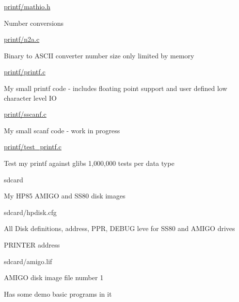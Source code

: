 \begin{DoxyItemize}
\begin{DoxyItemize}
\begin{DoxyItemize}
\end{DoxyItemize}
\item \hyperlink{mathio_8h}{printf/mathio.\+h}
\begin{DoxyItemize}
\item Number conversions
\end{DoxyItemize}
\item \hyperlink{n2a_8c}{printf/n2a.\+c}
\begin{DoxyItemize}
\item Binary to A\+S\+C\+II converter number size only limited by memory
\end{DoxyItemize}
\item \hyperlink{printf_8c}{printf/printf.\+c}
\begin{DoxyItemize}
\item My small printf code -\/ includes floating point support and user defined low character level IO
\end{DoxyItemize}
\item \hyperlink{sscanf_8c}{printf/sscanf.\+c}
\begin{DoxyItemize}
\item My small scanf code -\/ work in progress
\end{DoxyItemize}
\item \hyperlink{test__printf_8c}{printf/test\+\_\+printf.\+c}
\begin{DoxyItemize}
\item Test my printf against glibs 1,000,000 tests per data type
\end{DoxyItemize}
\end{DoxyItemize}
\item sdcard
\begin{DoxyItemize}
\item My H\+P85 A\+M\+I\+GO and S\+S80 disk images
\begin{DoxyItemize}
\item sdcard/hpdisk.\+cfg
\begin{DoxyItemize}
\item All Disk definitions, address, P\+PR, D\+E\+B\+UG leve for S\+S80 and A\+M\+I\+GO drives
\item P\+R\+I\+N\+T\+ER address
\end{DoxyItemize}
\item sdcard/amigo.\+lif
\begin{DoxyItemize}
\item A\+M\+I\+GO disk image file number 1
\item Has some demo basic programs in it

\end{DoxyItemize}
\end{DoxyItemize}
\end{DoxyItemize}
\end{DoxyItemize}
